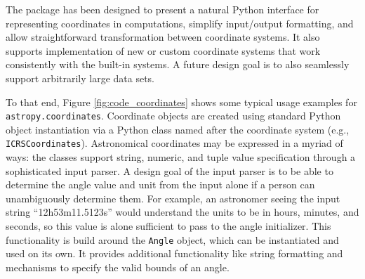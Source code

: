 \documentclass[traditabstract]{aa}
\begin{document}
The package has been designed to present a natural Python interface for
representing coordinates in computations, simplify input/output formatting,
and allow straightforward transformation between coordinate systems. It also
supports implementation of new or custom coordinate systems that work
consistently with the built-in systems. A future design goal is to also
seamlessly support arbitrarily large data sets.

To that end, Figure \ref{fig:code_coordinates} shows some typical usage
examples for \texttt{astropy.coordinates}. Coordinate objects are 
created using standard Python object instantiation via
a Python class named after the coordinate system (e.g.,
\texttt{ICRSCoordinates}). Astronomical coordinates may be expressed in a
myriad of ways: the classes support string, numeric, and tuple value
specification through a sophisticated input parser. A design goal of the input 
parser is to be able to determine the angle value and unit from the input 
alone if a person can unambiguously determine them. For example, an
astronomer seeing the input string ``12h53m11.5123s'' would understand 
the units to be in hours, minutes, and seconds, so this value is alone 
sufficient to pass to the angle initializer. This functionality is build around
the \texttt{Angle} object, which can be instantiated and used on
its own. It provides additional functionality like string formatting and
mechanisms to specify the valid bounds of an angle.
\end{document}

